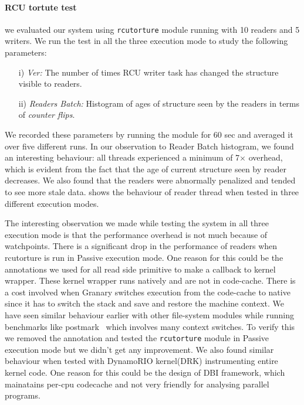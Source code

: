 \paragraph{RCU tortute test} we evaluated our system using \texttt{rcutorture} module running with 10 readers and 5 writers. We run the test in all the three execution mode to study the following parameters: %
\begin{enumerate}
	\item[i)] \emph{Ver:} The number of times RCU writer task has changed the structure visible to readers.
	\item[ii)] \emph{Readers Batch:} Histogram of ages of structure seen by the readers in terms of \emph{counter flips}.
\end{enumerate}
We recorded these parameters by running the module for 60 sec and averaged it over five different runs. 
In our observation to Reader Batch histogram, we found an interesting behaviour: all threads experienced a minimum of 7{\footnotesize$\times$} overhead, which is evident from the fact that the age of current structure seen by reader decreases. We also found that the readers were abnormally penalized and tended to see more stale data.  shows the behaviour of reader thread when tested in three different execution modes. 

The interesting observation we made while testing the system in all three execution mode is that the performance overhead is not much because of watchpoints. There is a significant drop in the performance of readers when rcutorture is run in Passive execution mode. One reason for this could be the annotations we used for all read side primitive to make a callback to kernel wrapper. These kernel wrapper runs natively and are not in code-cache. There is a cost involved when Granary switches execution from the code-cache to native since it has to switch the stack and save and restore the machine context. We have seen similar behaviour earlier with other file-system modules while running benchmarks like postmark~\cite{katcher97postmark} which involves many context switches. To verify this we removed the annotation and tested the \texttt{rcutorture} module in Passive execution mode but we didn't get any improvement. We also found similar behaviour when tested with DynamoRIO kernel(DRK) instrumenting entire kernel code. One reason for this could be the design of DBI framework, which mainatains per-cpu codecache and not very friendly for analysing parallel programs.    %

